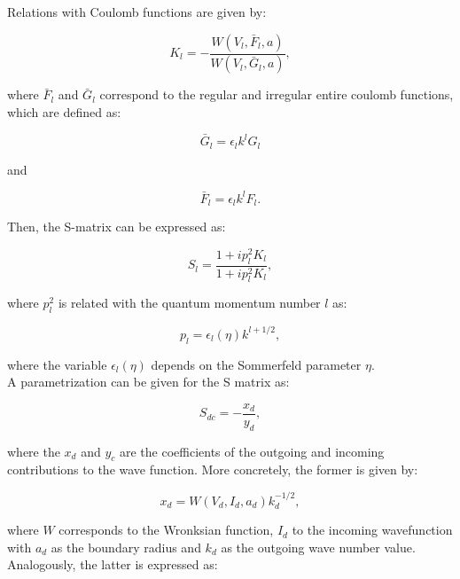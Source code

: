\documentclass[openany]{book}
\begin{document}
Relations with Coulomb functions are given by:

\begin{equation}\label{eq:rmatrix_kmatrix_coulomb}
	K_l = - \frac{W(V_l, \bar F_l, a)}{W(V_l, \bar G_l, a)},
\end{equation}

where $\bar F_l$ and $\bar G_l$ correspond to the regular and irregular entire coulomb functions, which are defined as:

\begin{equation}\label{eq:rmatrix_kmatrix_coulombG_entire}
	\bar G_l = \epsilon_l k^l G_l
\end{equation}

and 

\begin{equation}\label{eq:rmatrix_kmatrix_coulombF_entire}
	\bar F_l = \epsilon_l k^l F_l.
\end{equation}

 Then, the S-matrix can be expressed as: 

\begin{equation}\label{eq:rmatrix_kmatrix_Smatrix}
	S_l = \frac{1 + ip^2_l K_l}{1 + ip^2_l K_l},
\end{equation}

where $p^2_l$ is related with the quantum momentum number $l$ as:

\begin{equation}\label{eq:rmatrix_kmatrix_pl}
	p_l = \epsilon_l(\eta) k^{l + 1/2},
\end{equation}

where the variable $\epsilon_l(\eta)$ depends on the Sommerfeld parameter $\eta$. \\

A parametrization can be given for the S matrix as:

\begin{equation}\label{eq:rmatrix_kmatrix_Smatrix_definition}
	S_{dc} = - \frac{x_d}{y_d},
\end{equation}

where the $x_d$ and $y_c$ are the coefficients of the outgoing and incoming contributions to the wave function. More concretely, the former is given by:

\begin{equation}\label{eq:rmatrix_kmatrix_Smatrix_x}
	x_d = W(V_d, I_d, a_d) k^{-1/2}_d,
\end{equation}

where $W$ corresponds to the Wronksian function, $I_d$ to the incoming wavefunction  with $a_d$ as the boundary radius and $k_d$ as the outgoing wave number value. Analogously, the latter is expressed as: 
\end{document}

